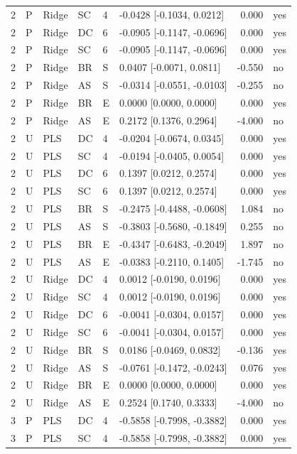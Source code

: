 \documentclass[10pt,a4paper]{article}
\begin{document}
\begin{longtable}{rlllllrl}
2 & P & Ridge & SC & 4 & -0.0428 [-0.1034, 0.0212] & 0.000 & yes \\
2 & P & Ridge & DC & 6 & -0.0905 [-0.1147, -0.0696] & 0.000 & yes \\
2 & P & Ridge & SC & 6 & -0.0905 [-0.1147, -0.0696] & 0.000 & yes \\
2 & P & Ridge & BR & S & 0.0407 [-0.0071, 0.0811] & -0.550 & no \\
2 & P & Ridge & AS & S & -0.0314 [-0.0551, -0.0103] & -0.255 & no \\
2 & P & Ridge & BR & E & 0.0000 [0.0000, 0.0000] & 0.000 & yes \\
2 & P & Ridge & AS & E & 0.2172 [0.1376, 0.2964] & -4.000 & no \\
2 & U & PLS & DC & 4 & -0.0204 [-0.0674, 0.0345] & 0.000 & yes \\
2 & U & PLS & SC & 4 & -0.0194 [-0.0405, 0.0054] & 0.000 & yes \\
2 & U & PLS & DC & 6 & 0.1397 [0.0212, 0.2574] & 0.000 & yes \\
2 & U & PLS & SC & 6 & 0.1397 [0.0212, 0.2574] & 0.000 & yes \\
2 & U & PLS & BR & S & -0.2475 [-0.4488, -0.0608] & 1.084 & no \\
2 & U & PLS & AS & S & -0.3803 [-0.5680, -0.1849] & 0.255 & no \\
2 & U & PLS & BR & E & -0.4347 [-0.6483, -0.2049] & 1.897 & no \\
2 & U & PLS & AS & E & -0.0383 [-0.2110, 0.1405] & -1.745 & no \\
2 & U & Ridge & DC & 4 & 0.0012 [-0.0190, 0.0196] & 0.000 & yes \\
2 & U & Ridge & SC & 4 & 0.0012 [-0.0190, 0.0196] & 0.000 & yes \\
2 & U & Ridge & DC & 6 & -0.0041 [-0.0304, 0.0157] & 0.000 & yes \\
2 & U & Ridge & SC & 6 & -0.0041 [-0.0304, 0.0157] & 0.000 & yes \\
2 & U & Ridge & BR & S & 0.0186 [-0.0469, 0.0832] & -0.136 & yes \\
2 & U & Ridge & AS & S & -0.0761 [-0.1472, -0.0243] & 0.076 & yes \\
2 & U & Ridge & BR & E & 0.0000 [0.0000, 0.0000] & 0.000 & yes \\
2 & U & Ridge & AS & E & 0.2524 [0.1740, 0.3333] & -4.000 & no \\
3 & P & PLS & DC & 4 & -0.5858 [-0.7998, -0.3882] & 0.000 & yes \\
3 & P & PLS & SC & 4 & -0.5858 [-0.7998, -0.3882] & 0.000 & yes \\

\end{longtable}
\end{document}
